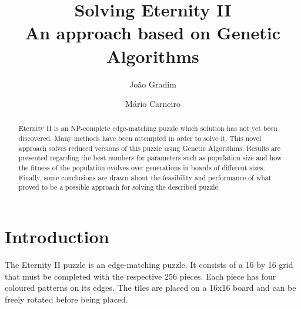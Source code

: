 \documentclass{llncs}
\begin{document}
%
\frontmatter          %
%
\pagestyle{headings}  %
%

\mainmatter              %
%
\title{Solving Eternity II\\
    \small{An approach based on Genetic Algorithms}
  }
  \author{João Gradim \and Mário Carneiro}
%
%

\maketitle              %

\begin{abstract}

Eternity II is an NP-complete edge-matching puzzle which solution has not yet been discovered. Many methods have been attempted in order to solve it. This novel approach solves reduced versions of this puzzle using Genetic Algorithms. Results are presented regarding the best numbers for parameters such as population size and how the fitness of the population evolves over generations in boards of different sizes. Finally, some conclusions are drawn about the feasibility and performance of what proved to be a possible approach for solving the described puzzle.
\end{abstract}
%
\section{Introduction}\label{sec:introduction}

The Eternity II puzzle is an edge-matching puzzle. It consists of a 16 by 16 grid that must be completed with the respective 256 pieces. Each piece has four coloured patterns on its edges. The tiles are placed on a 16x16 board and can be freely rotated before being placed.
\end{document}
